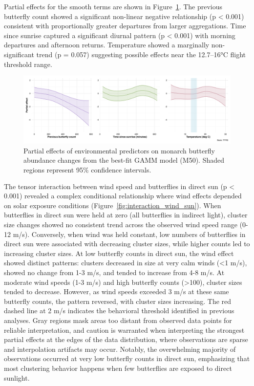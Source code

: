 

Partial effects for the smooth terms are shown in Figure~\ref{fig:partial_effects_30min}. The previous butterfly count showed a significant non-linear negative relationship (p < 0.001) consistent with proportionally greater departures from larger aggregations. Time since sunrise captured a significant diurnal pattern (p < 0.001) with morning departures and afternoon returns. Temperature showed a marginally non-significant trend (p = 0.057) suggesting possible effects near the 12.7–16°C flight threshold range.

\begin{figure}[htbp]
    \centering
    \includegraphics[width=\textwidth]{supplemental/results/30_min/figures/partial_effects_best_1x3.png}
    \caption{Partial effects of environmental predictors on monarch butterfly abundance changes from the best-fit GAMM model (M50). Shaded regions represent 95\% confidence intervals.}
    \label{fig:partial_effects_30min}
\end{figure}

The tensor interaction between wind speed and butterflies in direct sun (p < 0.001) revealed a complex conditional relationship where wind effects depended on solar exposure conditions (Figure~\ref{fig:interaction_wind_sun}). When butterflies in direct sun were held at zero (all butterflies in indirect light), cluster size changes showed no consistent trend across the observed wind speed range (0-12 m/s). Conversely, when wind was held constant, low numbers of butterflies in direct sun were associated with decreasing cluster sizes, while higher counts led to increasing cluster sizes. At low butterfly counts in direct sun, the wind effect showed distinct patterns: clusters decreased in size at very calm winds (<1 m/s), showed no change from 1-3 m/s, and tended to increase from 4-8 m/s. At moderate wind speeds (1-3 m/s) and high butterfly counts (>100), cluster sizes tended to decrease. However, as wind speeds exceeded 3 m/s at these same butterfly counts, the pattern reversed, with cluster sizes increasing. The red dashed line at 2 m/s indicates the behavioral threshold identified in previous analyses. Gray regions mask areas too distant from observed data points for reliable interpretation, and caution is warranted when interpreting the strongest partial effects at the edges of the data distribution, where observations are sparse and interpolation artifacts may occur. Notably, the overwhelming majority of observations occurred at very low butterfly counts in direct sun, emphasizing that most clustering behavior happens when few butterflies are exposed to direct sunlight. 

